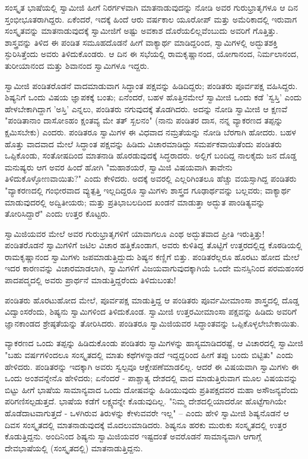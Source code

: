 ಸಂಸ್ಕೃತ ಭಾಷೆಯಲ್ಲಿ ಸ್ವಾಮೀಜಿ ಹೀಗೆ ನಿರರ್ಗಳವಾಗಿ ಮಾತನಾಡುವುದನ್ನು ನೋಡಿ ಅವರ ಗುರುಭ್ರಾತೃಗಳೂ ಆ ದಿನ ಸ್ತಂಭೀಭೂತರಾಗಿದ್ದರು. ಏಕೆಂದರೆ, ಇದಕ್ಕೆ ಹಿಂದೆ ಆರು ವರ್ಷಕಾಲ ಯೂರೋಪ್ ಮತ್ತು ಅಮೆರಿಕಾದಲ್ಲಿ ಇರುವಾಗ ಸಂಸ್ಕೃತವನ್ನು ಮಾತನಾಡುವುದಕ್ಕೆ ಸ್ವಾಮೀಜಿಗೆ ಅಷ್ಟು ಅವಕಾಶ ದೊರೆಯಲಿಲ್ಲವೆಂಬುದು ಅವರಿಗೆ ಗೊತ್ತಿತ್ತು. ಶಾಸ್ತ್ರವನ್ನು ತಿಳಿದ ಈ ಪಂಡಿತ ಸಮೂಹದೊಡನೆ ಹೀಗೆ ವಾಕ್ಯಾರ್ಥ ಮಾಡಿದ್ದರಿಂದ, ಸ್ವಾಮಿಗಳಲ್ಲಿ ಅದ್ಭುತಶಕ್ತಿ ಸ್ಫುರಿಸಿತ್ತೆಂದು ಅವರು ತಿಳಿದುಕೊಂಡರು. ಆ ದಿನ ಈ ಸಭೆಯಲ್ಲಿ ರಾಮಕೃಷ್ಣಾನಂದ, ಯೋಗಾನಂದ, ನಿರ್ಮಲಾನಂದ, ತುರೀಯಾನಂದ ಮತ್ತು ಶಿವಾನಂದ ಸ್ವಾಮಿಗಳೂ ಇದ್ದರು.

ಸ್ವಾಮೀಜಿ ಪಂಡಿತರೊಡನೆ ವಾದಮಾಡುವಾಗ ಸಿದ್ಧಾಂತ ಪಕ್ಷವನ್ನು ಹಿಡಿದಿದ್ದರು; ಪಂಡಿತರು ಪೂರ್ವಪಕ್ಷ ವಹಿಸಿದ್ದರು. ಶಿಷ್ಯನಿಗೆ ಒಂದು ವಿಷಯ ಜ್ಞಾಪಕಕ್ಕೆ ಬಂತು; ಏನೆಂದರೆ, ಬಹಳ ಹೊತ್ತಿನಮೇಲೆ ಸ್ವಾಮೀಜಿ ಒಂದು ಕಡೆ 'ಸ್ವಸ್ತಿ' ಎಂದು ಹೇಳಬೇಕಾಗಿದ್ದಾಗ 'ಅಸ್ತಿ' ಎನ್ನಲು, ಪಂಡಿತರು ನಗುವುದಕ್ಕೆ ತೊಡಗಿದರು. ಅದನ್ನು ನೋಡಿ ಸ್ವಾಮೀಜಿ ಆ ಕ್ಷಣವೆ "ಪಂಡಿತಾನಾಂ ದಾಸೋಽಹಂ ಕ್ಷಂತವ್ಯ ಮೇ ತತ್ ಸ್ಖಲನಂ" (ನಾನು ಪಂಡಿತರ ದಾಸ, ನನ್ನ ವ್ಯಾಕರಣದ ತಪ್ಪನ್ನು ಕ್ಷಮಿಸಬೇಕು) ಎಂದರು. ಪಂಡಿತರೂ ಸ್ವಾಮಿಗಳ ಈ ವಿಧವಾದ ನಮ್ರತೆಯನ್ನು ನೋಡಿ ಬೆರಗಾಗಿ ಹೋದರು. ಬಹಳ ಹೊತ್ತು ವಾದವಾದ ಮೇಲೆ ಸಿದ್ಧಾಂತ ಪಕ್ಷವನ್ನು ಹಿಡಿದು ವಿಚಾರಮಾಡಿದ್ದು ಸಮರ್ಪಕವಾಯಿತೆಂದು ಪಂಡಿತರು ಒಪ್ಪಿಕೊಂಡು, ಸಂತೋಷದಿಂದ ಮಾತನಾಡಿ ಹೊರಡುವುದಕ್ಕೆ ಸಿದ್ಧರಾದರು. ಅಲ್ಲಿಗೆ ಬಂದಿದ್ದ ನಾಲಕೈದು ಜನ ದೊಡ್ಡ ಮನುಷ್ಯರು ಆಗ ಅವರ ಹಿಂದೆ ಹೋಗಿ "ಮಹಾಶಯರೆ, ಸ್ವಾಮಿಜಿ ವಿಷಯವಾಗಿ ತಾವೇನು ತಿಳಿದುಕೊಳ್ಳೋಣವಾಯಿತು?" ಎಂದು ಕೇಳಿದರು. ಅದಕ್ಕೆ ಅವರಲ್ಲಿ ಎಲ್ಲರಿಗಿಂತಲೂ ಹೆಚ್ಚು ವಯಸ್ಸಾಗಿದ್ದ ಪಂಡಿತರು "ವ್ಯಾಕರಣದಲ್ಲಿ ಗಂಭೀರವಾದ ವ್ಯುತ್ಪತ್ತಿ ಇಲ್ಲದಿದ್ದರೂ ಸ್ವಾಮಿಗಳು ಶಾಸ್ತ್ರದ ಗೂಢಾರ್ಥವನ್ನು ಬಲ್ಲವರು; ವಾಕ್ಯಾರ್ಥ ಮಾಡುವುದರಲ್ಲಿ ಅದ್ವಿತೀಯರು; ಮತ್ತು ಪ್ರತಿಭಾಬಲದಿಂದ ಖಂಡನೆ ಮಾಡುತ್ತಾ ಅದ್ಭುತ ಪಾಂಡಿತ್ಯವನ್ನು ತೋರಿಸಿದ್ದಾರೆ" ಎಂದು ಉತ್ತರ ಕೊಟ್ಟರು.

ಸ್ವಾಮಿಜಿಯವರ ಮೇಲೆ ಅವರ ಗುರುಭ್ರಾತೃಗಳಿಗೆ ಯಾವಾಗಲೂ ಎಂಥ ಅದ್ಭುತವಾದ ಪ್ರೀತಿ ಇರುತ್ತಿತ್ತು! ಪಂಡಿತರೊಡನೆ ಸ್ವಾಮಿಗಳಿಗೆ ಜಟಿಲ ವಿಚಾರ ಹತ್ತಿಕೊಂಡಾಗ, ಅವರು ಕುಳಿತಿದ್ದ ತೊಟ್ಟಿಗೆ ಉತ್ತರದಲ್ಲಿದ್ದ ಕೊಠಡಿಯಲ್ಲಿ ರಾಮಕೃಷ್ಣಾನಂದ ಸ್ವಾಮಿಗಳು ಜಪಮಾಡುತ್ತಿದ್ದುದು ಶಿಷ್ಯನ ಕಣ್ಣಿಗೆ ಬಿತ್ತು. ಪಂಡಿತರೆಲ್ಲರೂ ಹೊರಟು ಹೋದ ಮೇಲೆ ಇದರ ಕಾರಣವನ್ನು ವಿಚಾರಮಾಡಲಾಗಿ, ಸ್ವಾಮಿಗಳಿಗೆ ವಿಜಯವಾಗುವುದಕ್ಕಾಗಿಯೆ ಒಂದೇ ಮನಸ್ಸಿನಿಂದ ಪರಮಹಂಸರ ಪಾದಪದ್ಮದಲ್ಲಿ ಅವರು ಪ್ರಾರ್ಥನೆ ಮಾಡುತ್ತಿದ್ದರೆಂದು ತಿಳಿದುಬಂತು!

ಪಂಡಿತರು ಹೊರಟುಹೋದ ಮೇಲೆ, ಪೂರ್ವಪಕ್ಷ ಮಾಡುತ್ತಿದ್ದ ಆ ಪಂಡಿತರು ಪೂರ್ವಮೀಮಾಂಸಾ ಶಾಸ್ತ್ರದಲ್ಲಿ ದೊಡ್ಡ ವಿದ್ವಾಂಸರೆಂದು, ಶಿಷ್ಯನು ಸ್ವಾಮಿಗಳಿಂದ ತಿಳಿದುಕೊಂಡ. ಸ್ವಾಮೀಜಿ ಉತ್ತರಮೀಮಾಂಸಾ ಪಕ್ಷವನ್ನು ಹಿಡಿದು ಅವರಿಗೆ ಜ್ಞಾನಕಾಂಡದ ಶ್ರೇಷ್ಠತೆಯನ್ನು ತೋರಿಸಿದರು. ಪಂಡಿತರೂ ಸ್ವಾಮಿಜಿಯವರ ಸಿದ್ಧಾಂತವನ್ನು ಒಪ್ಪಿಕೊಳ್ಳಲೇಬೇಕಾಯಿತು.

ವ್ಯಾಕರಣದ ಒಂದು ತಪ್ಪನ್ನು ಹಿಡಿದುಕೊಂಡು ಪಂಡಿತರು ಸ್ವಾಮಿಗಳನ್ನು ಹಾಸ್ಯಮಾಡಿದರಷ್ಟೆ, ಆ ವಿಚಾರದಲ್ಲಿ ಸ್ವಾಮೀಜಿ "ಬಹು ವರ್ಷಗಳಿಂದಲೂ ಸಂಸ್ಕೃತದಲ್ಲಿ ಮಾತು ಕಥೆಗಳನ್ನಾಡದೆ ಇದ್ದದ್ದರಿಂದ ಹೀಗೆ ತಪ್ಪು ಬಂದು ಬಿಟ್ಟಿತು" ಎಂದು ಹೇಳಿದರು. ಪಂಡಿತರನ್ನು ಇದಕ್ಕಾಗಿ ಅವರು ಸ್ವಲ್ಪವೂ ಆಕ್ಷೇಪಣೆಮಾಡಲಿಲ್ಲ. ಆದರೆ ಈ ವಿಷಯವಾಗಿ ಸ್ವಾಮಿಗಳು ಈ ಒಂದು ಅಂಶವನ್ನೇನೊ ಹೇಳಿದರು; ಏನೆಂದರೆ - ಪಾಶ್ಚಾತ್ಯ ದೇಶದಲ್ಲಿ ವಾದ ಮಾಡುತ್ತಿರುವಾಗ ಮೂಲ ವಿಷಯವನ್ನು ಬಿಟ್ಟು ಹೀಗೆ ಭಾಷೆಯ ಸಾಮಾನ್ಯವಾದ ಒಂದು ದೋಷವನ್ನು ಹಿಡಿಯುವುದು ಪ್ರತಿಪಕ್ಷದವರ ಮಹಾ ಅಸೌಜನ್ಯವೆಂದು ಪರಿಗಣಿಸಲ್ಪಡುತ್ತದೆ. ಭಾಷೆಯ ಕಡೆಗೆ ಲಕ್ಷ್ಯವನ್ನೇ ಕೊಡುವುದಿಲ್ಲ. "ನಿಮ್ಮ ದೇಶದಲ್ಲಿಯಾದರೋ ಹೊಟ್ಟೆಗಾಗಿಯೇ ಹೊಡೆದಾಟವಾಗುತ್ತದೆ - ಒಳಗಿರುವ ತಿರುಳನ್ನು ಕೇಳುವವರೇ ಇಲ್ಲ" – ಎಂದು ಹೇಳಿ ಸ್ವಾಮೀಜಿ ಶಿಷ್ಯನೊಡನೆ ಆ ದಿವಸ ಸಂಸ್ಕೃತದಲ್ಲಿ ಮಾತನಾಡುವುದಕ್ಕೆ ಮೊದಲುಮಾಡಿದರು. ಶಿಷ್ಯನೂ ಹರಕು ಮುರುಕು ಸಂಸ್ಕೃತದಲ್ಲಿ ಉತ್ತರ ಕೊಡುತ್ತಿದ್ದನು. ಅಂದಿನಿಂದ ಶಿಷ್ಯನು ಸ್ವಾಮಿಜಿಯವರ ಇಷ್ಟದಂತೆ ಅವರೊಡನೆ ಸಾಮಾನ್ಯವಾಗಿ ಆಗಾಗ್ಗೆ ದೇವಭಾಷೆಯಲ್ಲಿ (ಸಂಸ್ಕೃತದಲ್ಲಿ) ಮಾತನಾಡುತ್ತಿದ್ದನು.

